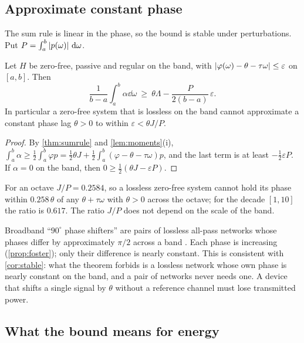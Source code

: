 \subsection{Approximate constant phase}

The sum rule is linear in the phase, so the bound is stable under
perturbations. Put $P=\int_a^b\left|p(\omega)\right|\,\mathrm d\omega$.

\begin{corollary}\label{cor:stable}
Let $H$ be zero-free, passive and regular on the band, with
$\left|\varphi(\omega)-\theta-\tau\omega\right|\le\varepsilon$ on $[a,b]$. Then
\[
\frac1{b-a}\int_a^b\alpha\dd\omega\ \ge\ \theta\Lambda-\frac{P}{2(b-a)}\,\varepsilon .
\]
In particular a zero-free system that is lossless on the band cannot
approximate a constant phase lag $\theta>0$ to within
$\varepsilon<\theta J/P$.
\end{corollary}

\begin{proof}
By \cref{thm:sumrule} and \cref{lem:moments}(i),
$\int_a^b\alpha\ge\frac12\int_a^b\varphi p=\frac12\theta J
+\frac12\int_a^b(\varphi-\theta-\tau\omega)p$, and the last term is at least
$-\frac12\varepsilon P$. If $\alpha=0$ on the band, then
$0\ge\frac12(\theta J-\varepsilon P)$.
\end{proof}

For an octave $J/P=0.2584$, so a lossless zero-free system cannot hold its
phase within $0.258\,\theta$ of any $\theta+\tau\omega$ with $\theta>0$ across
the octave; for the decade $[1,10]$ the ratio is $0.617$. The ratio $J/P$
does not depend on the scale of the band.

\begin{remark}\label{rem:darlington}
Broadband ``$90^\circ$ phase shifters'' are pairs of lossless all-pass
networks whose phases differ by approximately $\pi/2$ across a band
\cite{darlington}. Each phase is increasing (\cref{prop:foster}); only their
difference is nearly constant. This is consistent with \cref{cor:stable}:
what the theorem forbids is a lossless network whose own phase is nearly
constant on the band, and a pair of networks never needs one. A device that
shifts a single signal by $\theta$ without a reference channel must lose
transmitted power.
\end{remark}

\subsection{What the bound means for energy}\label{sec:energy}

